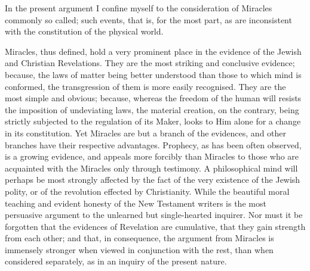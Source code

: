 In the present argument I confine myself to the
consideration of Miracles commonly so called; such events, that is,
for the most part, as are inconsistent with the constitution of the
physical world.

Miracles, thus defined, hold a very prominent
place in the evidence of the Jewish and Christian Revelations. They
are the most striking and conclusive evidence; because, the laws of
matter being better understood than those to which mind is conformed,
the transgression of them is more easily recognised. They are the most
simple and obvious; because, whereas the freedom of the human will
resists the imposition of undeviating laws, the material creation, on
the contrary, being strictly subjected to the regulation of its Maker, looks to Him alone for a change in its constitution. Yet
Miracles are but a branch of the evidences, and other branches have
their respective advantages. Prophecy, as has been often observed, is
a growing evidence, and appeals more forcibly than Miracles to those
who are acquainted with the Miracles only through testimony. A
philosophical mind will perhaps be most strongly affected by the fact
of the very existence of the Jewish polity, or of the revolution
effected by Christianity. While the beautiful moral teaching and
evident honesty of the New Testament writers is the most persuasive
argument to the unlearned but single-hearted inquirer. Nor must it be
forgotten that the evidences of Revelation are cumulative, that they
gain strength from each other; and that, in consequence, the argument
from Miracles is immensely stronger when viewed in conjunction with
the rest, than when considered separately, as in an inquiry of the
present nature.

